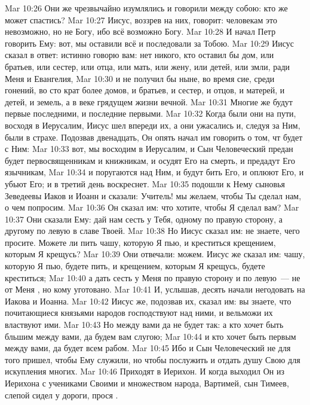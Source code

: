 \vs Mar 10:26 Они же чрезвычайно изумлялись и говорили между собою: кто же может спастись?
\vs Mar 10:27 Иисус, воззрев на них, говорит: человекам это невозможно, но не Богу, ибо всё возможно Богу.
\rsbpar\vs Mar 10:28 И начал Петр говорить Ему: вот, мы оставили всё и последовали за Тобою.
\vs Mar 10:29 Иисус сказал в ответ: истинно говорю вам: нет никого, кто оставил бы дом, или братьев, или сестер, или отца, или мать, или жену, или детей, или змли, ради Меня и Евангелия,
\vs Mar 10:30 и не получил бы ныне, во время сие, среди гонений, во сто крат более домов, и братьев, и сестер, и отцов, и матерей, и детей, и земель, а в веке грядущем жизни вечной.
\vs Mar 10:31 Многие же будут первые последними, и последние первыми.
\rsbpar\vs Mar 10:32 Когда были они на пути, восходя в Иерусалим, Иисус шел впереди их, а они ужасались и, следуя за Ним, были в страхе. Подозвав двенадцать, Он опять начал им говорить о том, чт будет с Ним:
\vs Mar 10:33 вот, мы восходим в Иерусалим, и Сын Человеческий предан будет первосвященникам и книжникам, и осудят Его на смерть, и предадут Его язычникам,
\vs Mar 10:34 и поругаются над Ним, и будут бить Его, и оплюют Его, и убьют Его; и в третий день воскреснет.
\vs Mar 10:35  подошли к Нему сыновья Зеведеевы Иаков и Иоанн и сказали: Учитель! мы желаем, чтобы Ты сделал нам, о чем попросим.
\vs Mar 10:36 Он сказал им: что хотите, чтобы Я сделал вам?
\vs Mar 10:37 Они сказали Ему: дай нам сесть у Тебя, одному по правую сторону, а другому по левую в славе Твоей.
\vs Mar 10:38 Но Иисус сказал им: не знаете, чего просите. Можете ли пить чашу, которую Я пью, и креститься крещением, которым Я крещусь?
\vs Mar 10:39 Они отвечали: можем. Иисус же сказал им: чашу, которую Я пью, будете пить, и крещением, которым Я крещусь, будете креститься;
\vs Mar 10:40 а дать сесть у Меня по правую сторону и по левую~--- не от Меня , но кому уготовано.
\vs Mar 10:41 И, услышав, десять начали негодовать на Иакова и Иоанна.
\vs Mar 10:42 Иисус же, подозвав их, сказал им: вы знаете, что почитающиеся князьями народов господствуют над ними, и вельможи их властвуют ими.
\vs Mar 10:43 Но между вами да не будет так: а кто хочет быть бльшим между вами, да будем вам слугою;
\vs Mar 10:44 и кто хочет быть первым между вами, да будет всем рабом.
\vs Mar 10:45 Ибо и Сын Человеческий не для того пришел, чтобы Ему служили, но чтобы послужить и отдать душу Свою для искупления многих.
\rsbpar\vs Mar 10:46 Приходят в Иерихон. И когда выходил Он из Иерихона с учениками Своими и множеством народа, Вартимей, сын Тимеев, слепой сидел у дороги, прося .
